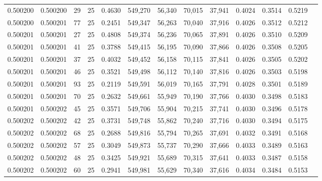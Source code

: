 \begin{tabular}{rrrrrrrrrrrrr}
0.500200 & 0.500200 &    29 &  25 &                                     0.4630 & 549,270 &  56,340 &  70,015 &  37,941 & 0.4024 & 0.3514 & 0.5219 \\
0.500200 & 0.500201 &    77 &  25 &                                     0.2451 & 549,347 &  56,263 &  70,040 &  37,916 & 0.4026 & 0.3512 & 0.5212 \\
0.500201 & 0.500201 &    27 &  25 &                                     0.4808 & 549,374 &  56,236 &  70,065 &  37,891 & 0.4026 & 0.3510 & 0.5209 \\
0.500201 & 0.500201 &    41 &  25 &                                     0.3788 & 549,415 &  56,195 &  70,090 &  37,866 & 0.4026 & 0.3508 & 0.5205 \\
0.500201 & 0.500201 &    37 &  25 &                                     0.4032 & 549,452 &  56,158 &  70,115 &  37,841 & 0.4026 & 0.3505 & 0.5202 \\
0.500201 & 0.500201 &    46 &  25 &                                     0.3521 & 549,498 &  56,112 &  70,140 &  37,816 & 0.4026 & 0.3503 & 0.5198 \\
0.500201 & 0.500201 &    93 &  25 &                                     0.2119 & 549,591 &  56,019 &  70,165 &  37,791 & 0.4028 & 0.3501 & 0.5189 \\
0.500201 & 0.500201 &    70 &  25 &                                     0.2632 & 549,661 &  55,949 &  70,190 &  37,766 & 0.4030 & 0.3498 & 0.5183 \\
0.500201 & 0.500202 &    45 &  25 &                                     0.3571 & 549,706 &  55,904 &  70,215 &  37,741 & 0.4030 & 0.3496 & 0.5178 \\
0.500202 & 0.500202 &    42 &  25 &                                     0.3731 & 549,748 &  55,862 &  70,240 &  37,716 & 0.4030 & 0.3494 & 0.5175 \\
0.500202 & 0.500202 &    68 &  25 &                                     0.2688 & 549,816 &  55,794 &  70,265 &  37,691 & 0.4032 & 0.3491 & 0.5168 \\
0.500202 & 0.500202 &    57 &  25 &                                     0.3049 & 549,873 &  55,737 &  70,290 &  37,666 & 0.4033 & 0.3489 & 0.5163 \\
0.500202 & 0.500202 &    48 &  25 &                                     0.3425 & 549,921 &  55,689 &  70,315 &  37,641 & 0.4033 & 0.3487 & 0.5158 \\
0.500202 & 0.500202 &    60 &  25 &                                     0.2941 & 549,981 &  55,629 &  70,340 &  37,616 & 0.4034 & 0.3484 & 0.5153 \\

\end{tabular}

